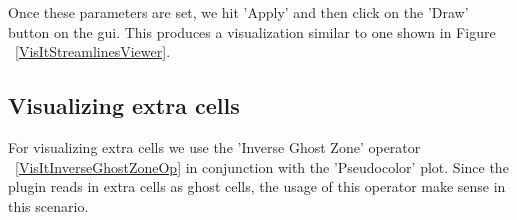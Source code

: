 

Once these parameters are set, we hit 'Apply' and then click on the 'Draw' button on the gui. This produces a visualization similar to one shown in Figure ~\ref{VisItStreamlinesViewer}.



\begin{figure}[h]
  \centering
 \vspace{5pt}
  \hspace{10pt}
 \hspace{10pt}
  \caption{}
 \vspace{-10pt}
  \label{}
\end{figure}


\subsection{Visualizing extra cells}

For visualizing extra cells we use the 'Inverse Ghost Zone' operator
~\ref{VisItInverseGhostZoneOp} in conjunction with the 'Pseudocolor'
plot. Since the plugin reads in extra cells as ghost cells, the usage
of this operator make sense in this scenario.

